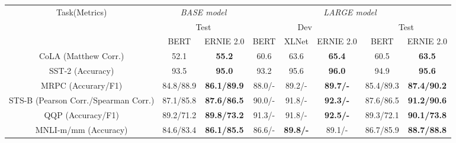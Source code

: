 \documentclass[letterpaper]{article} \usepackage{aaai20}  \usepackage{times}  \usepackage{helvet} \usepackage{courier}  \usepackage[hyphens]{url}  \usepackage{graphicx} \usepackage{makecell}
\begin{document}
\begin{table*}[htbp]
\centering
  \small
\begin{tabular}{c|cc|ccc|cc}
\hline \hline
\multirow{3}{*}{Task(Metrics)}       & \multicolumn{2}{c|}{\textit{BASE model}}   & \multicolumn{5}{c}{\textit{LARGE model}}                                                                                                        \\ \cline{2-8} 
                                     & \multicolumn{2}{c|}{Test}                  & \multicolumn{3}{c|}{Dev}                                                              & \multicolumn{2}{c}{Test}                                 \\ \cline{2-8} 
                                     & BERT      & \multicolumn{1}{c|}{ERNIE 2.0} & \multicolumn{1}{c}{BERT} & \multicolumn{1}{c}{XLNet} & \multicolumn{1}{c|}{ERNIE 2.0} & \multicolumn{1}{c}{BERT} & \multicolumn{1}{c}{ERNIE 2.0} \\ \hline
CoLA (Matthew Corr.)                 & 52.1      & \textbf{55.2}                  & 60.6                     & 63.6                      & \textbf{65.4}                  & 60.5                     & \textbf{63.5}                 \\
SST-2 (Accuracy)                     & 93.5      & \textbf{95.0}                  & 93.2                     & 95.6                      & \textbf{96.0}                  & 94.9                     & \textbf{95.6}                 \\
MRPC (Accurary/F1)                   & 84.8/88.9 & \textbf{86.1/89.9}             & 88.0/-                   & 89.2/-                    & \textbf{89.7/-}                & 85.4/89.3                & \textbf{87.4/90.2}            \\
STS-B (Pearson Corr./Spearman Corr.) & 87.1/85.8 & \textbf{87.6/86.5}             & 90.0/-                   & 91.8/-                    & \textbf{92.3/-}                & 87.6/86.5                & \textbf{91.2/90.6}            \\
QQP (Accuracy/F1)                    & 89.2/71.2 & \textbf{89.8/73.2}             & 91.3/-                  & 91.8/-                    & \textbf{92.5/-}                & 89.3/72.1                & \textbf{90.1/73.8}            \\
MNLI-m/mm (Accuracy)                    & 84.6/83.4      & \textbf{86.1/85.5}                  & 86.6/-                     & \textbf{89.8/-}                      & 89.1/-                  & 86.7/85.9                     & \textbf{88.7/88.8}                 \\

\end{tabular}
\end{table*}
\end{document}
